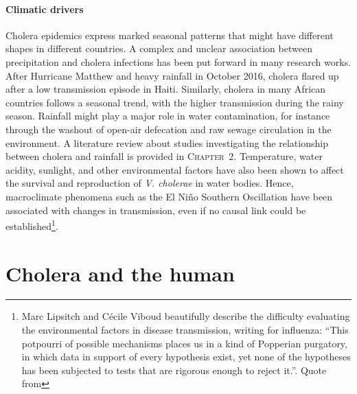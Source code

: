 \paragraph{Climatic drivers} Cholera epidemics express marked seasonal patterns that might have different shapes in different countries. A complex and unclear association between precipitation and cholera infections has been put forward in many research works. 
After Hurricane Matthew and heavy rainfall in October 2016, cholera flared up after a low transmission episode in Haiti\cite{Pasetto:RealtimeForecastingCholera:2018}. Similarly, cholera in many African countries follows a seasonal trend, with the higher transmission during the rainy season\cite{Baracchini:SeasonalityCholeraDynamics:2017}.  Rainfall might play a major role in water contamination, for instance through the washout of open-air defecation and raw sewage circulation in the environment. A literature review about studies investigating the relationship between cholera and rainfall is provided in \textsc{Chapter~2}. Temperature, water acidity, sunlight, and other environmental factors have also been shown to affect the survival and reproduction of \textit{V. cholerae} in water bodies. Hence, macroclimate phenomena such as the El Niño Southern Oscillation have been associated with changes in transmission, even if no causal link could be established\cite[-2\baselineskip]{Pascual:CholeraDynamicsNinoSouthern:2000}\footnote{Marc Lipsitch and Cécile Viboud beautifully describe the difficulty evaluating the environmental factors in disease transmission, writing for influenza: ``This potpourri of possible mechanisms places us in a kind of Popperian purgatory, in which data in support of every hypothesis exist, yet none of the hypotheses has been subjected to tests that are rigorous enough to reject it.''. Quote from  }.

\section{Cholera and the human} 
